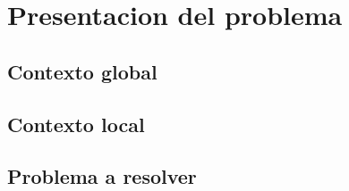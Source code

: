 \chapter{Presentacion del problema}
\section{Contexto global}
\section{Contexto local}
\section{Problema a resolver}


